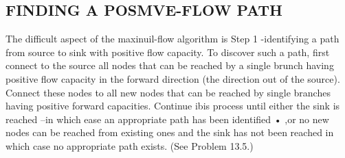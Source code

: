 \documentclass[11pt]{article} %
\begin{document}
\subsection{FINDING A POSMVE-FLOW PATH} The difficult aspect of the maxinuil-flow algorithm is Step 1 -identifying a path from source to sink with positive flow capacity. To discover such a path, first connect to the source all nodes that can be reached by a single brunch having positive flow capacity in the forward direction (the direction out of the source). Connect these nodes to all new nodes that can be reached by single branches having positive forward capacities. Continue ibis process until either the sink is reached --in which ease an appropriate path has been identified • ,or no new nodes can be reached from existing ones and the sink has not been reached in which case no appropriate path exists. (See Problem 13.5.) 
\end{document}

